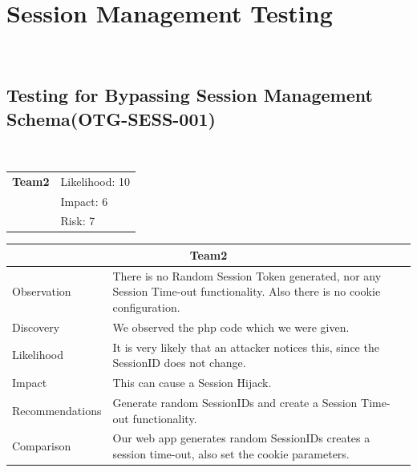 \documentclass[headsepline,footsepline,footinclude=false,oneside,fontsize=11pt,paper=a4,listof=totoc,bibliography=totoc]{scrbook} %
\begin{document}
\section{Session Management Testing}\
\subsection{Testing for Bypassing Session Management Schema(OTG-SESS-001)}\

\begin{tabular}{cR{12cm}}
	\textbf{Team2} & Likelihood: 10\\ & Impact: 6\\& Risk: 7
\end{tabular}

\begin{tabular}{ l|p{11cm}  }
	\hline
	\multicolumn{2}{c}{\textbf{Team2}} \\
	\hline
	Observation   & There is no Random Session Token generated, nor any Session Time-out functionality. Also there is no cookie configuration.\\
	Discovery  & We observed the php code which we were given.\\
	Likelihood & It is very likely that an attacker notices this, since the SessionID does not change.\\
	Impact    & This can cause a Session Hijack.\\
	Recommendations & Generate random SessionIDs and create a Session Time-out functionality.\\
	Comparison& Our web app generates random SessionIDs creates a session time-out, also set the cookie parameters. \\
	\hline
\end{tabular}
\\
\vspace{0.5cm}
\\
\end{document}
